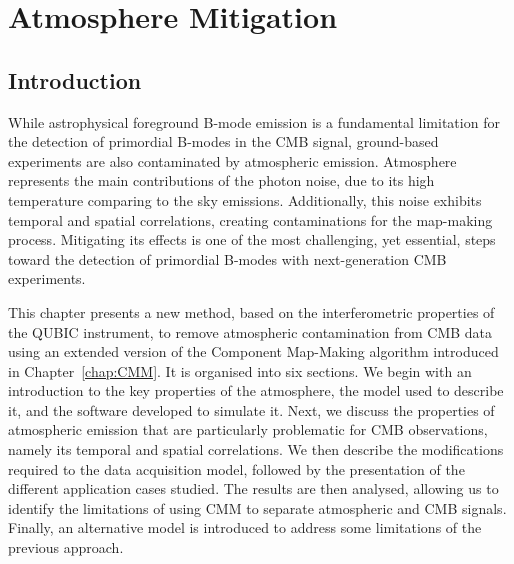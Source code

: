 \documentclass[../../thesis.tex]{subfiles}
\begin{document}
\chapter{Atmosphere Mitigation} \label{chap:atm}

\ifSubfilesClassLoaded{
    \tableofcontents
}{
    \minitoc
}

\section*{Introduction}

While astrophysical foreground B-mode emission is a fundamental limitation for the detection of primordial B-modes in the CMB signal, ground-based experiments are also contaminated by atmospheric emission. Atmosphere represents the main contributions of the photon noise, due to its high temperature comparing to the sky emissions. Additionally, this noise exhibits temporal and spatial correlations, creating contaminations for the map-making process. Mitigating its effects is one of the most challenging, yet essential, steps toward the detection of primordial B-modes with next-generation CMB experiments.

This chapter presents a new method, based on the interferometric properties of the QUBIC instrument, to remove atmospheric contamination from CMB data using an extended version of the Component Map-Making algorithm introduced in Chapter~\ref{chap:CMM}. It is organised into six sections. We begin with an introduction to the key properties of the atmosphere, the model used to describe it, and the software developed to simulate it. Next, we discuss the properties of atmospheric emission that are particularly problematic for CMB observations, namely its temporal and spatial correlations. We then describe the modifications required to the data acquisition model, followed by the presentation of the different application cases studied. The results are then analysed, allowing us to identify the limitations of using CMM to separate atmospheric and CMB signals. Finally, an alternative model is introduced to address some limitations of the previous approach. \\
\end{document}
